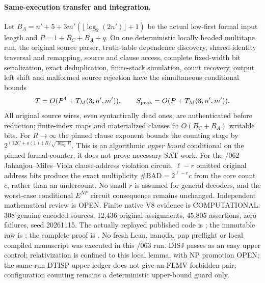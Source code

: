 \documentclass[11pt]{article}
\begin{document}
\paragraph{Same-execution transfer and integration.}
Let $B_A=n'+5+3m'(\lfloor\log_2(2n')\rfloor+1)$ be the
actual low-first formal input length and
$P=1+B_C+B_A+q$. On one deterministic locally headed
multitape run, the original source parser, truth-table
dependence discovery, shared-identity traversal and
remapping, source and clause access, complete fixed-width
bit serialization, exact deduplication, finite-stack
simulation, count recovery, output left shift and malformed
source rejection have the simultaneous conditional bounds
\[
T=O(P^4+T_M(3,n',m')), \qquad
S_{\rm peak}=O(P+T_M(3,n',m')).
\]
All original source wires, even syntactically dead ones,
are authenticated before reduction; finite-index maps
and materialized clauses fit $O(B_C+B_A)$ writable bits.
For $R\to\infty$ the pinned clause exponent bounds the
counting stage by
$2^{(12C+o(1))R/\sqrt{\log_2 R}}$.
This is an algorithmic \emph{upper bound} conditional on
the pinned formal counter; it does not prove necessary
SAT work. For the /062 Jahanjou--Miles--Viola
clause-address violation circuit, $\ell-r$ omitted
original address bits produce the exact multiplicity
$\#\mathrm{BAD}=2^{\ell-r}c$ from the core count $c$,
rather than an undercount. No small $r$ is assumed
for general decoders, and the worst-case conditional
$E^{NP}$ circuit consequence remains unchanged.
Independent mathematical review is OPEN.
Finite native V8 evidence is COMPUTATIONAL: 308 genuine
encoded sources, 12,436 original assignments, 45,805
assertions, zero failures, seed 20261115.
The actually replayed published code is
;
the immutable raw is
;
the complete proof is
.
No fresh Lean, nanoda, pnp preflight or local compiled manuscript
was executed in this /063 run. DISJ passes as an easy upper control;
relativization is confined to this local lemma, with NP promotion OPEN;
the same-run DTISP upper ledger does not give an FLMV forbidden pair;
configuration counting remains a deterministic upper-bound guard only.
\end{document}
